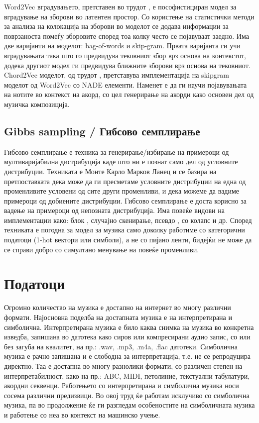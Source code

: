 Word2Vec вградувањето, претставен во трудот \cite{Mikolov2013}, е пософистициран модел за вградување на зборови во латентен простор. Со користење на статистички методи за анализа на колокација на зборови во моделот се додава информации за поврзаноста помеѓу зборовите според тоа колку често се појавуваат заедно. Има две варијанти на моделот: bag-of-words и skip-gram. Првата варијанта ги учи вградувањата така што го предвидува тековниот збор врз основа на контекстот, додека другиот модел ги предвидува ближните зборови врз основа на тековниот. 
Chord2Vec моделот, од трудот \cite{Madjiheurem2016}, претставува имплементација на skipgram моделот од Word2Vec со NADE елементи. Наменет е да ги научи појавувањата на нотите во контекст на акорд, со цел генерирање на акорди како основен дел од музичка композиција. 

\section{Gibbs sampling / Гибсово семплирање}

Гибсово семплирање е техника за генерирање/избирање на примероци од мултиваријабилна дистрибуција каде што ни е познат само дел од условните дистрибуции. Техниката е Монте Карло Марков Ланец и се базира на претпоставката дека може да ги пресметаме условните дистрибуции на една од променливите условени од сите други променливи, и дека можеме да вадиме примероци од добиените дистрибуции. Гибсово семплирање е доста корисно за вадење на примероци од непозната дистрибуција. Има повеќе видови на имплементации како: блок \cite{Boulanger-Lewandowski2012, Goel2014}, случајно скенирање, псевдо \cite{Hadjeres2016}, со колапс и др. Според \cite{Hadjeres2016} техниката е погодна за модел за музика само доколку работиме со категорични податоци (1-hot вектори или симболи), а не со пијано ленти, бидејќи не може да се справи добро со симултано менување на повеќе променливи.

\chapter{Податоци}
\label{ch:podatoci}

Огромно количество на музика е достапно на интернет во многу различни формати. Најосновна поделба на достапната музика е на интерпретирана и симболична. Интерпретирана музика е било каква снимка на музика во конкретна изведба, запишана во датотека како сиров или компресирани аудио запис, со или без загуба на квалитет, на пр.: .wav, .mp3, .m4a, .flac датотеки. Симболична музика е рачно запишана и е слободна за интерпретација, т.е. не се репродуцира директно. Таа е достапна во многу разнолики формати, со различен степен на интерпретабилност, како на пр.: ABC, MIDI, петолиние, текстуални табулатури, акордни секвенци.
Работењето со интерпретирана и симболична музика носи сосема различни предизвици. Во овој труд ќе работам исклучиво со симболична музика, па во продолжение ќе ги разгледам особеностите на симболичната музика и работење со неа во контекст на машинско учење.

